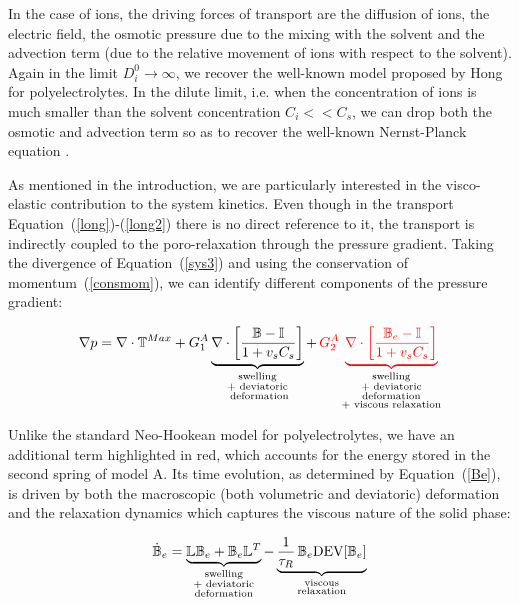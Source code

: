In the case of ions, the driving forces of transport are the diffusion of ions, the electric field, the osmotic pressure due to the mixing with the solvent and the advection term (due to the relative movement of ions with respect to the solvent). Again in the limit $D^0_i\rightarrow\infty$, we recover the well-known model proposed by Hong \cite{Reviewpolyel} for polyelectrolytes. In the dilute limit, i.e. when the concentration of ions is much smaller than the solvent  concentration $C_i<<C_s$, we can drop both the osmotic and advection term so as to recover the well-known Nernst-Planck equation \cite[see Equation (6.67)]{Reviewpolyel}.

As mentioned in the introduction, we are particularly interested in the visco-elastic contribution to the system kinetics. Even though in the transport Equation~(\ref{long})-(\ref{long2}) there is no direct reference to it, the transport is indirectly coupled to the poro-relaxation through the pressure gradient. Taking the divergence of Equation~(\ref{sys3}) and using the conservation of momentum~(\ref{consmom}), we can identify different components of the pressure gradient:

\begin{equation}
\nabla p= \nabla \cdot \mathbb{T}^{Max} + G_1^A\underbrace{ \nabla \cdot \left[\frac{\mathbb{B}-\mathbb{I}}{1+v_sC_s}\right]}_{\substack{\text{swelling}\\\text{+ deviatoric}\\\text{ deformation}}} + \,\color{red} G_2^A \underbrace{\nabla \cdot\left[\frac{\mathbb{B}_e-\mathbb{I}}{1+v_sC_s}\right]}_{\color{black}\substack{\text{swelling}\\\text{+ deviatoric}\\\text{deformation}\\\text{+ viscous relaxation}}}\color{black}
\end{equation}

Unlike the standard Neo-Hookean model for polyelectrolytes, we have an additional term highlighted in red, which accounts for the energy stored in the second spring of model A. Its time evolution, as determined by Equation~(\ref{Be}), is driven by both the macroscopic (both volumetric and deviatoric) deformation and the relaxation dynamics which captures the viscous nature of the solid phase:

\begin{equation}
\dot{\mathbb{B}}_e=\underbrace{\mathbb{L}\mathbb{B}_e + \mathbb{B}_e \mathbb{L}^T}_{\substack{\text{swelling}\\\text{+ deviatoric}\\\text{deformation}}} - \underbrace{\frac{1}{\tau_R} \,\mathbb{B}_e\text{DEV}[\mathbb{B}_e]}_{\substack{\text{viscous}\\\text{relaxation}}}\label{Be2}
\end{equation}


